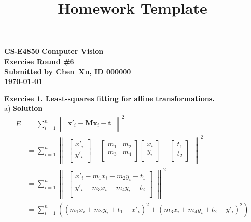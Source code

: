 \documentclass[letterpaper, 11pt]{article}
\begin{document}
\title{Homework Template}

\begin{center}
    {
        \large
        \bf
        CS-E4850 Computer Vision\\
        Exercise Round \#6\\
        Submitted by Chen\ Xu, ID 000000\\
        \today
    }
\end{center}

\bigskip

\textbf{Exercise 1. Least-squares fitting for affine transformations.}\\
a)
\textbf{Solution}\\
\begin{align*}
    E & =\sum_{i=1}^{n}
    \begin{Vmatrix}
        \textbf{x}'_i-\textbf{M}\textbf{x}_i-\textbf{t} \\
    \end{Vmatrix}^2                                 \\
      & =\sum_{i=1}^{n}
    \begin{Vmatrix}
        \begin{bmatrix}
            x'_i \\
            y'_i \\
        \end{bmatrix}
        -
        \begin{bmatrix}
            m_1 & m_2 \\
            m_3 & m_4 \\
        \end{bmatrix}
        \begin{bmatrix}
            x_i \\
            y_i \\
        \end{bmatrix}
        -
        \begin{bmatrix}
            t_1 \\
            t_2 \\
        \end{bmatrix}
    \end{Vmatrix}^2                                                        \\
      & =\sum_{i=1}^{n}
    \begin{Vmatrix}
        \begin{bmatrix}
            x'_i-m_1 x_i-m_2 y_i-t_1 \\
            y'_i-m_3 x_i-m_4 y_i-t_2 \\
        \end{bmatrix}
    \end{Vmatrix}^2                                                        \\
      & =\sum_{i=1}^{n} ((m_1 x_i+m_2 y_i+t_1-x'_i)^2+(m_3 x_i+m_4 y_i+t_2-y'_i)^2)
\end{align*}
\end{document}
